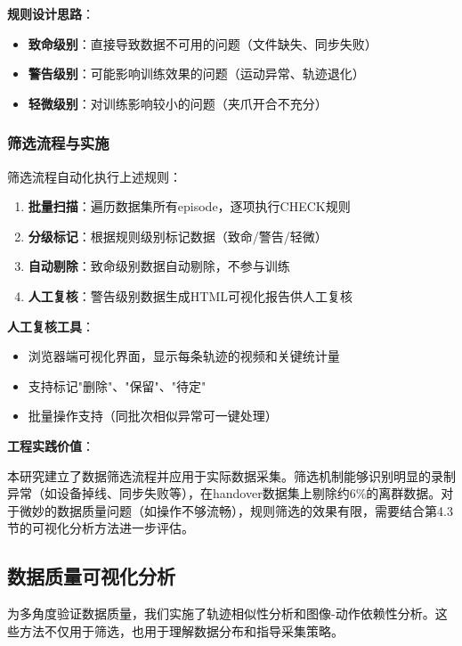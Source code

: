 \textbf{规则设计思路}：
\begin{itemize}[leftmargin=2em]
    \item \textbf{致命级别}：直接导致数据不可用的问题（文件缺失、同步失败）
    \item \textbf{警告级别}：可能影响训练效果的问题（运动异常、轨迹退化）
    \item \textbf{轻微级别}：对训练影响较小的问题（夹爪开合不充分）
\end{itemize}

\subsubsection{筛选流程与实施}

筛选流程自动化执行上述规则：

\begin{enumerate}[leftmargin=2em]
    \item \textbf{批量扫描}：遍历数据集所有episode，逐项执行CHECK规则
    \item \textbf{分级标记}：根据规则级别标记数据（致命/警告/轻微）
    \item \textbf{自动剔除}：致命级别数据自动剔除，不参与训练
    \item \textbf{人工复核}：警告级别数据生成HTML可视化报告供人工复核
\end{enumerate}

\textbf{人工复核工具}：
\begin{itemize}[leftmargin=2em]
    \item 浏览器端可视化界面，显示每条轨迹的视频和关键统计量
    \item 支持标记"删除"、"保留"、"待定"
    \item 批量操作支持（同批次相似异常可一键处理）
\end{itemize}

\textbf{工程实践价值}：

本研究建立了数据筛选流程并应用于实际数据采集。筛选机制能够识别明显的录制异常（如设备掉线、同步失败等），在handover数据集上剔除约6\%的离群数据。对于微妙的数据质量问题（如操作不够流畅），规则筛选的效果有限，需要结合第4.3节的可视化分析方法进一步评估。

\subsection{数据质量可视化分析}

为多角度验证数据质量，我们实施了轨迹相似性分析和图像-动作依赖性分析。这些方法不仅用于筛选，也用于理解数据分布和指导采集策略。

